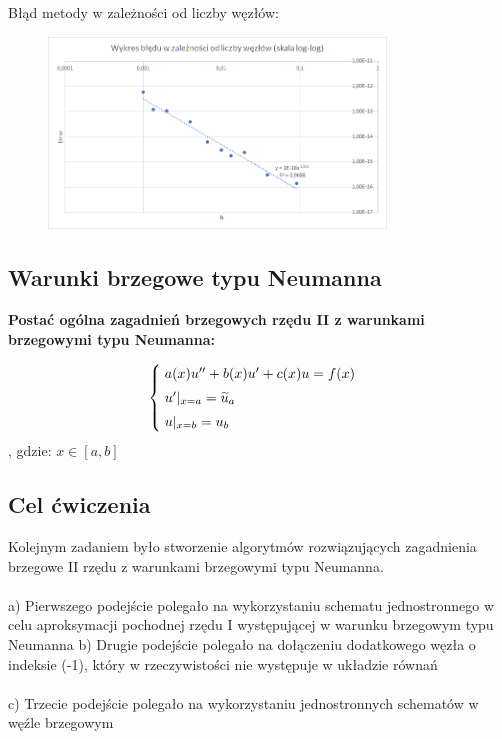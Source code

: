 \begin{samepage}
	Błąd metody w zależności od liczby węzłów:
	\begin{figure}[!ht]
		\begin{center}
			\includegraphics[width=0.8\textwidth]{Lab4/charts/zad3/error.png}
		\end{center}
	\end{figure}
	\FloatBarrier
\end{samepage} 

\subsection{Warunki brzegowe typu Neumanna}
\textbf{Postać ogólna zagadnień brzegowych rzędu II z warunkami brzegowymi typu Neumanna:}

\[
\begin{cases}
\vspace{0.1cm} 
\hspace{0,1cm} a(x) u'' + b(x)u' + c(x)u =f(x) \\
\vspace{0.1cm}
\hspace{0,1cm}u'|_{x=a} = \widetilde{u}_{a} \\
\hspace{0,1cm}u|_{x=b} = u_{b}
\end{cases}
\]
, gdzie:
$x\in[a,b]$
\\

\subsection{Cel ćwiczenia}
Kolejnym zadaniem było stworzenie algorytmów rozwiązujących zagadnienia brzegowe II rzędu z warunkami brzegowymi typu Neumanna.
\\\\
a) Pierwszego podejście polegało na wykorzystaniu schematu jednostronnego w celu aproksymacji pochodnej rzędu I występującej w warunku brzegowym typu Neumanna
\newpage
b) Drugie podejście polegało na dołączeniu dodatkowego węzła o indeksie (-1), który w rzeczywistości nie występuje w układzie równań
\\\\
c) Trzecie podejście polegało na wykorzystaniu jednostronnych schematów w węźle brzegowym

